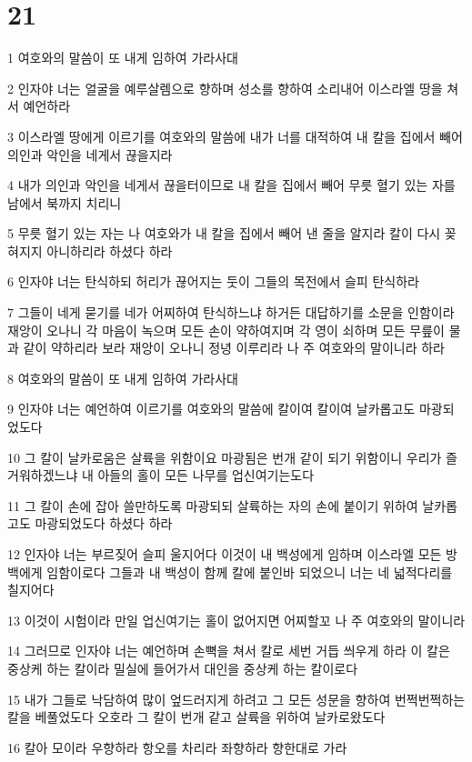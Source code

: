 \chapter{21}

\par 1 여호와의 말씀이 또 내게 임하여 가라사대
\par 2 인자야 너는 얼굴을 예루살렘으로 향하며 성소를 향하여 소리내어 이스라엘 땅을 쳐서 예언하라
\par 3 이스라엘 땅에게 이르기를 여호와의 말씀에 내가 너를 대적하여 내 칼을 집에서 빼어 의인과 악인을 네게서 끊을지라
\par 4 내가 의인과 악인을 네게서 끊을터이므로 내 칼을 집에서 빼어 무릇 혈기 있는 자를 남에서 북까지 치리니
\par 5 무릇 혈기 있는 자는 나 여호와가 내 칼을 집에서 빼어 낸 줄을 알지라 칼이 다시 꽂혀지지 아니하리라 하셨다 하라
\par 6 인자야 너는 탄식하되 허리가 끊어지는 둣이 그들의 목전에서 슬피 탄식하라
\par 7 그들이 네게 묻기를 네가 어찌하여 탄식하느냐 하거든 대답하기를 소문을 인함이라 재앙이 오나니 각 마음이 녹으며 모든 손이 약하여지며 각 영이 쇠하며 모든 무릎이 물과 같이 약하리라 보라 재앙이 오나니 정녕 이루리라 나 주 여호와의 말이니라 하라
\par 8 여호와의 말씀이 또 내게 임하여 가라사대
\par 9 인자야 너는 예언하여 이르기를 여호와의 말씀에 칼이여 칼이여 날카롭고도 마광되었도다
\par 10 그 칼이 날카로움은 살륙을 위함이요 마광됨은 번개 같이 되기 위함이니 우리가 즐거워하겠느냐 내 아들의 홀이 모든 나무를 업신여기는도다
\par 11 그 칼이 손에 잡아 쓸만하도록 마광되되 살륙하는 자의 손에 붙이기 위하여 날카롭고도 마광되었도다 하셨다 하라
\par 12 인자야 너는 부르짖어 슬피 울지어다 이것이 내 백성에게 임하며 이스라엘 모든 방백에게 임함이로다 그들과 내 백성이 함께 칼에 붙인바 되었으니 너는 네 넓적다리를 칠지어다
\par 13 이것이 시험이라 만일 업신여기는 홀이 없어지면 어찌할꼬 나 주 여호와의 말이니라
\par 14 그러므로 인자야 너는 예언하며 손뼉을 쳐서 칼로 세번 거듭 씌우게 하라 이 칼은 중상케 하는 칼이라 밀실에 들어가서 대인을 중상케 하는 칼이로다
\par 15 내가 그들로 낙담하여 많이 엎드러지게 하려고 그 모든 성문을 향하여 번쩍번쩍하는 칼을 베풀었도다 오호라 그 칼이 번개 같고 살륙을 위하여 날카로왔도다
\par 16 칼아 모이라 우향하라 항오를 차리라 좌향하라 향한대로 가라
